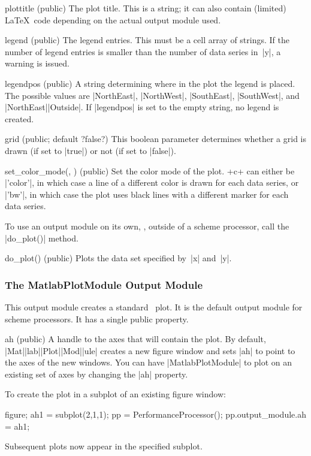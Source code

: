 \begin{property}{plottitle (public)}
  The plot title. This is a string; it can also
  contain (limited) \LaTeX\ code depending on the actual output module used.
\end{property}

\begin{property}{legend (public)}
  The legend entries. This must be a cell array of
  strings. If the number of legend entries is smaller than the number of data
  series in~|y|, a warning is issued.
\end{property}

\begin{property}{legendpos (public)}
  A string determining where in the plot the legend is
  placed. The possible values are |NorthEast|, |NorthWest|, |SouthEast|,
  |SouthWest|, and |NorthEast|\-|Outside|. If |legendpos| is set to
  the empty string, no legend is created.
\end{property}

\begin{property}{grid (public; default ?false?)}
  This boolean parameter determines whether a grid is drawn (if set to |true|)
  or not (if set to |false|).
\end{property}

\begin{method}{set_color_mode(\obj, ) (public)}
  Set the color mode of the plot. +c+ can either be |'color'|, in which case a
  line of a different color is drawn for each data series, or |'bw'|, in which
  case the plot uses black lines with a different marker for each data series.
\end{method}

To use an output module on its own, \ie, outside of a scheme processor, call the
|do_plot()| method.
\begin{method}{do_plot(\obj) (public)}
  Plots the data set specified by~|x| and~|y|.
\end{method}


\subsubsection{The MatlabPlotModule Output Module}

This output module creates a standard \matlab\ plot. It is the default output
module for scheme processors. It has a single public property.
\begin{property}{ah (public)}
  A handle to the axes that will contain the plot. By default,
  |Mat|\-|lab|\-|Plot|\-|Mod|\-|ule| creates a new figure window and sets |ah|
  to point to the axes of the new windows. You can have |MatlabPlotModule| to
  plot on an existing set of axes by changing the |ah| property. 
    
  \codeexample To create the plot in a subplot of an existing figure window:
\begin{Code}
  figure;
  ah1 = subplot(2,1,1);
  pp = PerformanceProcessor();
  pp.output_module.ah = ah1;
\end{Code}
  Subsequent plots now appear in the specified subplot.
\end{property}


